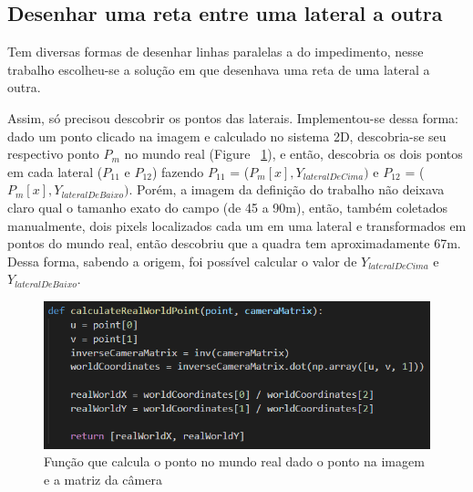 \documentclass{article}
\begin{document}
    \subsection{Desenhar uma reta entre uma lateral a outra}
    Tem diversas formas de desenhar linhas paralelas a do impedimento, nesse trabalho escolheu-se a solução em que desenhava uma reta de uma lateral a outra.

    Assim, só precisou descobrir os pontos das laterais. Implementou-se dessa forma: dado um ponto clicado na imagem e calculado no sistema 2D, descobria-se seu respectivo ponto \(P_m\) no mundo real (Figure ~\ref{fig:calculateRealWorldPoint}), e então, descobria os dois pontos em cada lateral (\(P_{11}\) e \(P_{12}\)) fazendo \(P_{11}\) = (\(P_m[x], Y_{lateralDeCima})\) e \(P_{12}\) = (\(P_m[x], Y_{lateralDeBaixo})\). Porém, a imagem da definição do trabalho não deixava claro qual o tamanho exato do campo (de 45 a 90m), então, também coletados manualmente, dois pixels localizados cada um em uma lateral e transformados em pontos do mundo real, então descobriu que a quadra tem aproximadamente 67m. Dessa forma, sabendo a origem, foi possível calcular o valor de \(Y_{lateralDeCima}\) e \(Y_{lateralDeBaixo}\).

    \begin{figure}[h!]
    \centering
    \includegraphics[scale=0.9]{calculateRealWorldPoint.PNG}
    \caption{Função que calcula o ponto no mundo real dado o ponto na imagem e a matriz da câmera}
    \label{fig:calculateRealWorldPoint}
    \end{figure}
\end{document}
